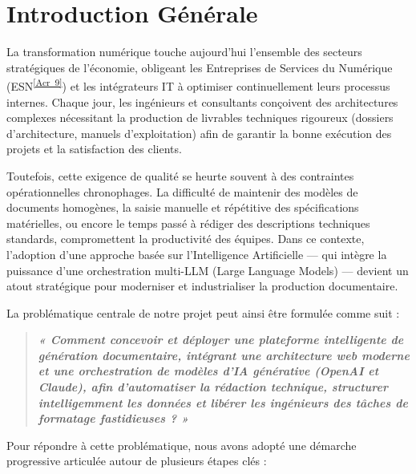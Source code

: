 \documentclass[12pt, a4paper]{report}
\newcommand{\acref}[1]{\textsuperscript{\hyperlink{acr:#1}{[Acr~#1]}}}
\begin{document}
\chapter*{Introduction Générale}

La transformation numérique touche aujourd’hui l’ensemble des secteurs stratégiques de l'économie, obligeant les Entreprises de Services du Numérique (ESN\acref{9}) et les intégrateurs IT à optimiser continuellement leurs processus internes. Chaque jour, les ingénieurs et consultants conçoivent des architectures complexes nécessitant la production de livrables techniques rigoureux (dossiers d'architecture, manuels d'exploitation) afin de garantir la bonne exécution des projets et la satisfaction des clients.

Toutefois, cette exigence de qualité se heurte souvent à des contraintes opérationnelles chronophages. La difficulté de maintenir des modèles de documents homogènes, la saisie manuelle et répétitive des spécifications matérielles, ou encore le temps passé à rédiger des descriptions techniques standards, compromettent la productivité des équipes. Dans ce contexte, l’adoption d’une approche basée sur l'Intelligence Artificielle — qui intègre la puissance d'une orchestration multi-LLM (Large Language Models) — devient un atout stratégique pour moderniser et industrialiser la production documentaire.

La problématique centrale de notre projet peut ainsi être formulée comme suit :

\begin{quote}
\textbf{\textit{« Comment concevoir et déployer une plateforme intelligente de génération documentaire, intégrant une architecture web moderne et une orchestration de modèles d'IA générative (OpenAI et Claude), afin d’automatiser la rédaction technique, structurer intelligemment les données et libérer les ingénieurs des tâches de formatage fastidieuses ? »}}
\end{quote}

Pour répondre à cette problématique, nous avons adopté une démarche progressive articulée autour de plusieurs étapes clés :
\end{document}
